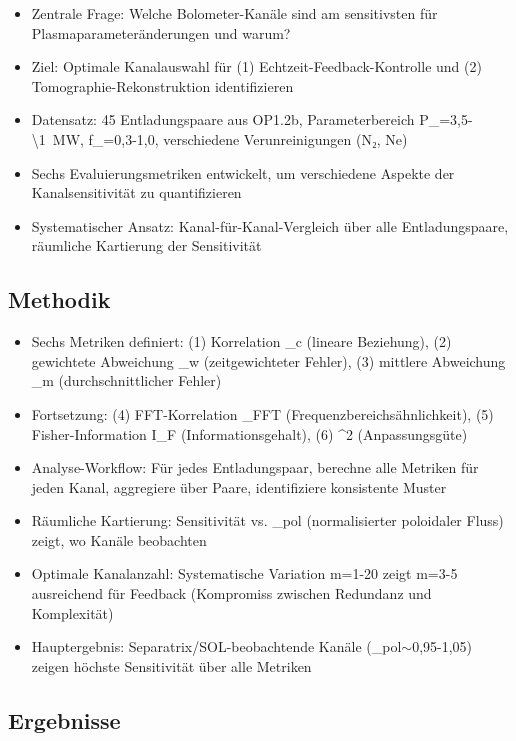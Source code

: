 \documentclass[11pt,a4paper]{article}
\begin{document}
\begin{itemize}
\item Zentrale Frage: Welche Bolometer-Kanäle sind am sensitivsten für Plasmaparameteränderungen und warum?
\item Ziel: Optimale Kanalauswahl für (1) Echtzeit-Feedback-Kontrolle und (2) Tomographie-Rekonstruktion identifizieren
\item Datensatz: 45 Entladungspaare aus OP1.2b, Parameterbereich P_{}=3,5-\SI{\1}{MW}, f_{}=0,3-1,0, verschiedene Verunreinigungen (N₂, Ne)
\item Sechs Evaluierungsmetriken entwickelt, um verschiedene Aspekte der Kanalsensitivität zu quantifizieren
\item Systematischer Ansatz: Kanal-für-Kanal-Vergleich über alle Entladungspaare, räumliche Kartierung der Sensitivität
\end{itemize}

\subsection{Methodik}

\begin{itemize}
\item Sechs Metriken definiert: (1) Korrelation \rho_c (lineare Beziehung), (2) gewichtete Abweichung \sigma_w (zeitgewichteter Fehler), (3) mittlere Abweichung \sigma_m (durchschnittlicher Fehler)
\item Fortsetzung: (4) FFT-Korrelation \rho_FFT (Frequenzbereichsähnlichkeit), (5) Fisher-Information I_F (Informationsgehalt), (6) \chi^2 (Anpassungsgüte)
\item Analyse-Workflow: Für jedes Entladungspaar, berechne alle Metriken für jeden Kanal, aggregiere über Paare, identifiziere konsistente Muster
\item Räumliche Kartierung: Sensitivität vs. \rho_pol (normalisierter poloidaler Fluss) zeigt, wo Kanäle beobachten
\item Optimale Kanalanzahl: Systematische Variation m=1-20 zeigt m=3-5 ausreichend für Feedback (Kompromiss zwischen Redundanz und Komplexität)
\item Hauptergebnis: Separatrix/SOL-beobachtende Kanäle (\rho_pol$\sim$0,95-1,05) zeigen höchste Sensitivität über alle Metriken
\end{itemize}

\subsection{Ergebnisse}
\end{document}
